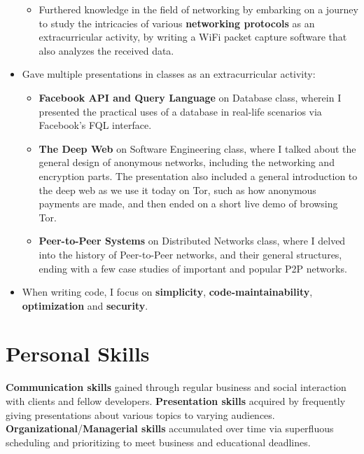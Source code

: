 \documentclass[11pt,a4paper,sans]{moderncv}
\begin{document}
\begin{itemize}
\begin{itemize}
		\item	Furthered knowledge in the field of networking by embarking on a journey to study the intricacies of various \textbf{networking protocols} as an extracurricular activity, by writing a WiFi packet capture software that also analyzes the received data.
		\end{itemize}
	\item	Gave multiple presentations in classes as an extracurricular activity:
		\begin{itemize}
		\item	\textbf{Facebook API and Query Language} on Database class, wherein I presented the practical uses of a database in real-life scenarios via Facebook's FQL interface.
		\item	\textbf{The Deep Web} on Software Engineering class, where I talked about the general design of anonymous networks, including the networking and encryption parts. The presentation also included a general introduction to the deep web as we use it today on Tor, such as how anonymous payments are made, and then ended on a short live demo of browsing Tor.
		\item	\textbf{Peer-to-Peer Systems} on Distributed Networks class, where I delved into the history of Peer-to-Peer networks, and their general structures, ending with a few case studies of important and popular P2P networks.
		\end{itemize}
	\item	When writing code, I focus on \textbf{simplicity}, \textbf{code-maintainability}, \textbf{optimization} and \textbf{security}.
	\end{itemize}

\section{Personal Skills}
	\textbf{Communication skills} gained through regular business and social interaction with clients and fellow developers. \textbf{Presentation skills} acquired by frequently giving presentations about various topics to varying audiences. \textbf{Organizational}/\textbf{Managerial skills} accumulated over time via superfluous scheduling and prioritizing to meet business and educational deadlines.
\end{document}
